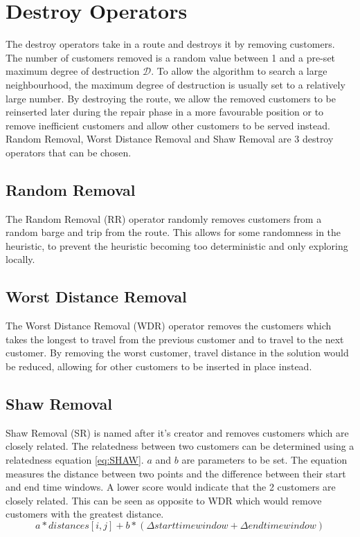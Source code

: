 \section{Destroy Operators}
The destroy operators take in a route and destroys it by removing customers. The number of customers removed is a random value between 1 and a pre-set maximum degree of destruction $\mathcal{D}$. To allow the algorithm to search a large neighbourhood, the maximum degree of destruction is usually set to a relatively large number. By destroying the route, we allow the removed customers to be reinserted later during the repair phase in a more favourable position or to remove inefficient customers and allow other customers to be served instead. Random Removal, Worst Distance Removal and Shaw Removal are 3 destroy operators that can be chosen.

\subsection{Random Removal}
The Random Removal (RR) operator randomly removes customers from a random barge and trip from the route. This allows for some randomness in the heuristic, to prevent the heuristic becoming too deterministic and only exploring locally.

\subsection{Worst Distance Removal}
The Worst Distance Removal (WDR) operator removes the customers which takes the longest to travel from the previous customer and to travel to the next customer. By removing the worst customer, travel distance in the solution would be reduced, allowing for other customers to be inserted in place instead.

\subsection{Shaw Removal}
Shaw Removal (SR) is named after it's creator \cite{goos_using_1998} and removes customers which are closely related. The relatedness between two customers can be determined using a relatedness equation \ref{eq:SHAW}. $a$ and $b$ are parameters to be set. The equation measures the distance between two points and the difference between their start and end time windows. A lower score would indicate that the 2 customers are closely related. This can be seen as opposite to WDR which would remove customers with the greatest distance.
\begin{equation} \label{eq:SHAW} 
a*distances[i,j] +b*(\Delta{starttimewindow} + \Delta{endtimewindow})
\end{equation}


